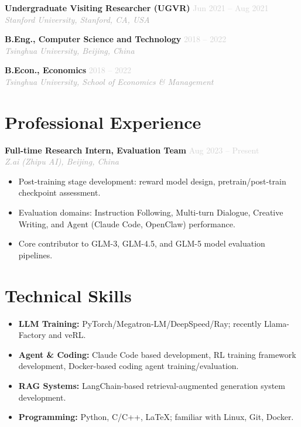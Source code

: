 \documentclass[11pt, a4paper]{article}
\newcommand{\cventry}[4]{%
    \noindent\textbf{#1} \hfill \textcolor{lightgray}{\small #2} \\
    \textit{\textcolor{darkgray}{#3}} \hfill \textcolor{lightgray}{\small #4} \\[-0.3em]
}
\begin{document}
\cventry{Undergraduate Visiting Researcher (UGVR)}{Jun 2021 -- Aug 2021}{Stanford University, Stanford, CA, USA}{}
\hspace{1em}{\small Robotics. Advised by Prof.\ Silvio Savarese and Prof.\ Kuan Fang.}
\vspace{0.6em}

\cventry{B.Eng., Computer Science and Technology}{2018 -- 2022}{Tsinghua University, Beijing, China}{}
\hspace{1em}{\small Transferred from Department of Chemical Engineering (2017--2018).}
\vspace{0.6em}

\cventry{B.Econ., Economics}{2018 -- 2022}{Tsinghua University, School of Economics \& Management}{}

\vspace{-0.4em}

\section{Professional Experience}

\cventry{Full-time Research Intern, Evaluation Team}{Aug 2023 -- Present}{Z.ai (Zhipu AI), Beijing, China}{}
\begin{itemize}[leftmargin=1.5em, topsep=2pt, itemsep=1pt, parsep=0pt]
    \item Post-training stage development: reward model design, pretrain/post-train checkpoint assessment.
    \item Evaluation domains: Instruction Following, Multi-turn Dialogue, Creative Writing, and Agent (Claude Code, OpenClaw) performance.
    \item Core contributor to GLM-3, GLM-4.5, and GLM-5 model evaluation pipelines.
\end{itemize}

\section{Technical Skills}

\begin{itemize}[leftmargin=1.5em, topsep=2pt, itemsep=2pt, parsep=0pt]
    \item \textbf{LLM Training:} PyTorch/Megatron-LM/DeepSpeed/Ray; recently Llama-Factory and veRL.
    \item \textbf{Agent \& Coding:} Claude Code based development, RL training framework development, Docker-based coding agent training/evaluation.
    \item \textbf{RAG Systems:} LangChain-based retrieval-augmented generation system development.
    \item \textbf{Programming:} Python, C/C++, LaTeX; familiar with Linux, Git, Docker.
\end{itemize}
\end{document}
